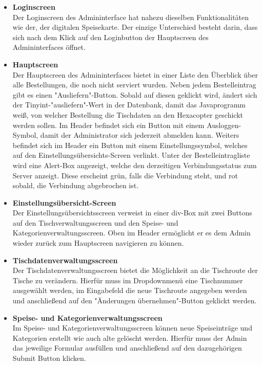 \begin{itemize}
    \item \textbf{Loginscreen}\\
Der Loginscreen des Admininterface hat nahezu dieselben Funktionalitäten wie der, der digitalen Speisekarte. Der einzige Unterschied besteht darin, dass sich nach dem Klick auf den Loginbutton der Hauptscreen des Admininterfaces öffnet.
    \item \textbf{Hauptscreen}\\
Der Hauptscreen des Admininterfaces bietet in einer Liste den Überblick über alle Bestellungen, die noch nicht serviert wurden. 
Neben jedem Bestelleintrag gibt es einen "Ausliefern"-Button. Sobald auf diesen geklickt wird, ändert sich der Tinyint-"ausliefern"-Wert in der Datenbank, damit das Javaprogramm weiß, von welcher Bestellung die Tischdaten an den Hexacopter geschickt werden sollen.
Im Header befindet sich ein Button mit einem Ausloggen-Symbol, damit der Administrator sich jederzeit abmelden kann. Weiters befindet sich im Header ein Button mit einem Einstellungssymbol, welches auf den Einstellungsübersichts-Screen verlinkt.
Unter der Bestelleintragliste wird eine Alert-Box angezeigt, welche den derzeitigen Verbindungsstatus zum Server anzeigt. Diese erscheint grün, falls die Verbindung steht, und rot sobald, die Verbindung abgebrochen ist.
    \item \textbf{Einstellungsübersicht-Screen}\\
Der Einstellungsübersichtsscreen verweist in einer div-Box mit zwei Buttons auf den Tischverwaltungsscreen und den Speise- und Kategorienverwaltungsscreen.
Oben im Header ermöglicht er es dem Admin wieder zurück zum Hauptscreen navigieren zu können.
    \item \textbf{Tischdatenverwaltungsscreen}\\
Der Tischdatenverwaltungsscreen bietet die Möglichkeit an die Tischroute der Tische zu verändern. Hierfür muss im Dropdownmenü eine Tischnummer ausgewählt werden, im Eingabefeld die neue Tischroute angegeben werden und anschließend auf den "Änderungen übernehmen"-Button geklickt werden.
    \item \textbf{Speise- und Kategorienverwaltungsscreen}\\
Im Speise- und Kategorienverwaltungsscreen können neue Speiseinträge und Kategorien erstellt wie auch alte gelöscht werden.      
Hierfür muss der Admin das jeweilige Formular ausfüllen und anschließend auf den dazugehörigen Submit Button klicken.
  \end{itemize} 
